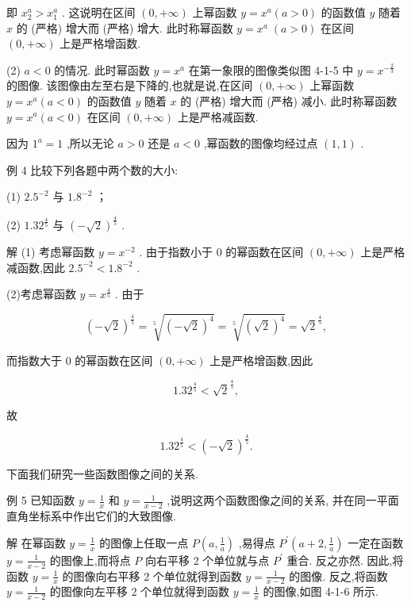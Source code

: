 \documentclass[10pt]{article}
\begin{document}
即 \({x}_{2}^{a} > {x}_{1}^{a}\) . 这说明在区间 \(\left( {0, + \infty }\right)\) 上幂函数 \(y = {x}^{a}\left( {a > 0}\right)\) 的函数值 \(y\) 随着 \(x\) 的 (严格) 增大而 (严格) 增大. 此时称幂函数 \(y = {x}^{a} \; \left( {a > 0}\right)\) 在区间 \(\left( {0, + \infty }\right)\) 上是严格增函数.

(2) \(a < 0\) 的情况. 此时幂函数 \(y = {x}^{a}\) 在第一象限的图像类似图 4-1-5 中 \(y = {x}^{-\frac{2}{3}}\) 的图像. 该图像由左至右是下降的,也就是说,在区间 \(\left( {0, + \infty }\right)\) 上幂函数 \(y = {x}^{a}\left( {a < 0}\right)\) 的函数值 \(y\) 随着 \(x\) 的 (严格) 增大而 (严格) 减小. 此时称幂函数 \(y = {x}^{a}\left( {a < 0}\right)\) 在区间 \(\left( {0, + \infty }\right)\) 上是严格减函数.

因为 \({1}^{a} = 1\) ,所以无论 \(a > 0\) 还是 \(a < 0\) ,幂函数的图像均经过点 \(\left( {1,1}\right)\) .



例 4 比较下列各题中两个数的大小:

(1) \({2.5}^{-2}\) 与 \({1.8}^{-2}\) ；

(2) \({1.32}^{\frac{4}{5}}\) 与 \({\left( -\sqrt{2}\right) }^{\frac{4}{5}}\) .

解 (1) 考虑幂函数 \(y = {x}^{-2}\) . 由于指数小于 0 的幂函数在区间 \(\left( {0, + \infty }\right)\) 上是严格减函数,因此 \({2.5}^{-2} < {1.8}^{-2}\) .

(2)考虑幂函数 \(y = {x}^{\frac{4}{5}}\) . 由于

\[
{\left( -\sqrt{2}\right) }^{\frac{4}{5}} = \sqrt[5]{{\left( -\sqrt{2}\right) }^{4}} = \sqrt[5]{{\left( \sqrt{2}\right) }^{4}} = {\sqrt{2}}^{\frac{4}{5}},
\]

而指数大于 0 的幂函数在区间 \(\left( {0, + \infty }\right)\) 上是严格增函数,因此

\[
{1.32}^{\frac{4}{5}} < {\sqrt{2}}^{\frac{4}{5}},
\]

故

\[
{1.32}^{\frac{4}{5}} < {\left( -\sqrt{2}\right) }^{\frac{4}{5}}.
\]

下面我们研究一些函数图像之间的关系.

例 5 已知函数 \(y = \frac{1}{x}\) 和 \(y = \frac{1}{x - 2}\) ,说明这两个函数图像之间的关系, 并在同一平面直角坐标系中作出它们的大致图像.

解 在幂函数 \(y = \frac{1}{x}\) 的图像上任取一点 \(P\left( {a,\frac{1}{a}}\right)\) ,易得点 \({P}^{\prime }\left( {a + 2,\frac{1}{a}}\right)\) 一定在函数 \(y = \frac{1}{x - 2}\) 的图像上,而将点 \(P\) 向右平移 2 个单位就与点 \({P}^{\prime }\) 重合. 反之亦然. 因此,将函数 \(y = \frac{1}{x}\) 的图像向右平移 2 个单位就得到函数 \(y = \frac{1}{x - 2}\) 的图像. 反之,将函数 \(y = \frac{1}{x - 2}\) 的图像向左平移 2 个单位就得到函数 \(y = \frac{1}{x}\) 的图像,如图 4-1-6 所示.
\end{document}
